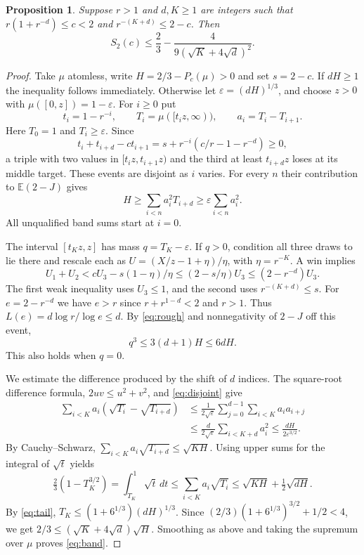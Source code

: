 \documentclass[11pt,reqno]{amsart}
\newtheorem{proposition}[theorem]{Proposition}
\newcommand{\EE}{\mathbb E}
\begin{document}
\begin{proposition}\label{prop:band}
Suppose $r>1$ and $d,K\ge1$ are integers such that
$r(1+r^{-d})\le c<2$ and $r^{-(K+d)}\le 2-c$. Then
\begin{equation}\label{eq:band}
 S_2(c)\le \frac23-\frac4{9(\sqrt K+4\sqrt d)^2}.
\end{equation}
\end{proposition}
\begin{proof}
Take $\mu$ atomless, write $H=2/3-P_c(\mu)>0$ and set $s=2-c$.
If $dH\ge1$ the inequality follows immediately.
Otherwise let $\varepsilon=(dH)^{1/3}$, and choose $z>0$ with
$\mu([0,z])=1-\varepsilon$. For $i\ge0$ put
\[
 t_i=1-r^{-i},\qquad T_i=\mu([t_i z,\infty)),\qquad a_i=T_i-T_{i+1}.
\]
Here $T_0=1$ and $T_i\ge\varepsilon$. Since
\[
 t_i+t_{i+d}-ct_{i+1}
   =s+r^{-i}(c/r-1-r^{-d})\ge0,
\]
a triple with two values in $[t_i z,t_{i+1}z)$ and the third at least
$t_{i+d}z$ loses at its middle target. These events are disjoint as
$i$ varies. For every $n$ their contribution to $\EE(2-J)$ gives
\begin{equation}\label{eq:disjoint}
 H\ge\sum_{i<n}a_i^2 T_{i+d}\ge\varepsilon\sum_{i<n}a_i^2.
\end{equation}
All unqualified band sums start at $i=0$.

The interval $[t_K z,z]$ has mass $q=T_K-\varepsilon$. If $q>0$,
condition all three draws to lie there and rescale each as
$U=(X/z-1+\eta)/\eta$, with $\eta=r^{-K}$. A win implies
\[
 U_1+U_2<cU_3-s(1-\eta)/\eta
       \le (2-s/\eta)U_3\le (2-r^{-d})U_3 .
\]
The first weak inequality uses $U_3\le1$, and the second uses
$r^{-(K+d)}\le s$. For $e=2-r^{-d}$ we have $e>r$ since
$r+r^{1-d}<2$ and $r>1$. Thus $L(e)=d\log r/\log e\le d$.
By \eqref{eq:rough} and nonnegativity of $2-J$ off this event,
\begin{equation}\label{eq:tail}
 q^3\le 3(d+1)H\le6dH .
\end{equation}
This also holds when $q=0$.

We estimate the difference produced by the shift of $d$ indices.
The square-root difference formula, $2uv\le u^2+v^2$, and
\eqref{eq:disjoint} give
\begin{align*}
 \sum_{i<K}a_i(\sqrt{T_i}-\sqrt{T_{i+d}})
 &\le \frac1{2\sqrt\varepsilon}
       \sum_{j=0}^{d-1}\sum_{i<K}a_i a_{i+j} \\
 &\le \frac d{2\sqrt\varepsilon}\sum_{i<K+d} a_i^2
 \le \frac{dH}{2\varepsilon^{3/2}}.
\end{align*}
By Cauchy--Schwarz, $\sum_{i<K}a_i\sqrt{T_{i+d}}\le\sqrt{KH}$.
Using upper sums for the integral of $\sqrt t$ yields
\[
 \tfrac23(1-T_K^{3/2})=\int_{T_K}^1\sqrt t\,dt
 \le\sum_{i<K}a_i\sqrt{T_i}\le\sqrt{KH}+\tfrac12\sqrt{dH}.
\]
By \eqref{eq:tail}, $T_K\le(1+6^{1/3})(dH)^{1/3}$.
Since $(2/3)(1+6^{1/3})^{3/2}+1/2<4$, we get
$2/3\le(\sqrt K+4\sqrt d)\sqrt H$. Smoothing as above and taking
the supremum over $\mu$ proves \eqref{eq:band}.
\end{proof}
\end{document}
